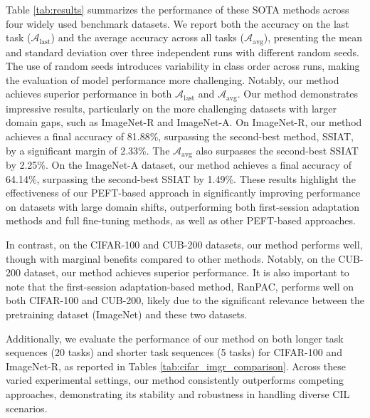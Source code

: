 Table \ref{tab:results} summarizes the performance of these SOTA methods across four widely used benchmark datasets. We report both the accuracy on the last task ($\mathcal{A}_{\text{last}}$) and the average accuracy across all tasks ($\mathcal{A}_{\text{avg}}$), presenting the mean and standard deviation over three independent runs with different random seeds. The use of random seeds introduces variability in class order across runs, making the evaluation of model performance more challenging. Notably, our method achieves superior performance in both $\mathcal{A}_{\text{last}}$ and $\mathcal{A}_{\text{avg}}$. Our method demonstrates impressive results, particularly on the more challenging datasets with larger domain gaps, such as ImageNet-R and ImageNet-A. On ImageNet-R, our method achieves a final accuracy of 81.88\%, surpassing the second-best method, SSIAT, by a significant margin of 2.33\%. The $\mathcal{A}_{\text{avg}}$ also surpasses the second-best SSIAT by 2.25\%. On the ImageNet-A dataset, our method achieves a final accuracy of 64.14\%, surpassing the second-best SSIAT by 1.49\%. These results highlight the effectiveness of our PEFT-based approach in significantly improving performance on datasets with large domain shifts, outperforming both first-session adaptation methods and full fine-tuning methods, as well as other PEFT-based approaches.

In contrast, on the CIFAR-100 and CUB-200 datasets, our method performs well, though with marginal benefits compared to other methods. Notably, on the CUB-200 dataset, our method achieves superior performance. It is also important to note that the first-session adaptation-based method, RanPAC, performs well on both CIFAR-100 and CUB-200, likely due to the significant relevance between the pretraining dataset (ImageNet) and these two datasets.



Additionally, we evaluate the performance of our method on both longer task sequences (20 tasks) and shorter task sequences (5 tasks) for CIFAR-100 and ImageNet-R, as reported in Tables \ref{tab:cifar_imgr_comparison}. Across these varied experimental settings, our method consistently outperforms competing approaches, demonstrating its stability and robustness in handling diverse CIL scenarios.

